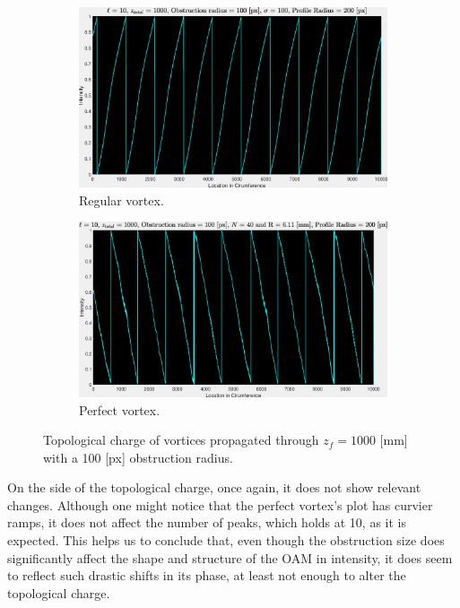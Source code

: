 \begin{figure}[htbp]
    \centering
    \begin{subfigure}[b]{0.45\textwidth}
        \centering
        \includegraphics[width=\textwidth]{images/c04/type=0_r=100_zi=0_zf=1000_TC.eps}
        \caption{Regular vortex.}
    \end{subfigure}
    \hfill
    \begin{subfigure}[b]{0.45\textwidth}
        \centering
        \includegraphics[width=\textwidth]{images/c04/type=1_r=100_zi=0_zf=1000_TC.eps}
        \caption{Perfect vortex.}
    \end{subfigure}
    \caption{Topological charge of vortices propagated through $z_f = 1000$ [mm] with a 100 [px] obstruction radius.}
    \label{fig:Vortices_r=100_z=1000_TC}
\end{figure}

On the side of the topological charge, once again, it does not show relevant changes. Although one might notice that the perfect vortex's plot has curvier ramps, it does not affect the number of peaks, which holds at 10, as it is expected. This helps us to conclude that, even though the obstruction size does significantly affect the shape and structure of the OAM in intensity, it does seem to reflect such drastic shifts in its phase, at least not enough to alter the topological charge.

